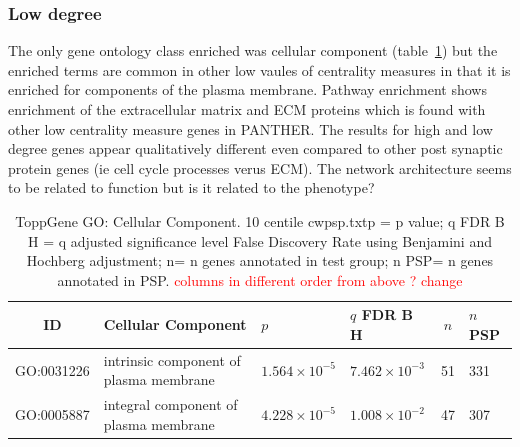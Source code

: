 \subsubsection{Low degree}
The only gene ontology class enriched was cellular component (table~\ref{tab:ToppGENE GO: Cellular Component. 10 centile cwpsp.txtp = p value; q FDR B H = q adjusted significance level False Discovery Rate using Benjamini and Hochberg adjustment; n= n genes annotated in test group; n PSP= n genes annotated in PSP}) but the enriched terms are common in other low vaules of centrality measures in that it is enriched for components of the plasma membrane. Pathway enrichment shows enrichment of the extracellular matrix and ECM proteins which is found with other low centrality measure genes in PANTHER. The results for high and low degree genes appear qualitatively different even compared to other post synaptic protein genes (ie cell cycle processes verus ECM). The network architecture seems to be related to function but is it related to the phenotype?



\begin{table}[ht]
\centering

\begin{adjustbox}{width=\textwidth}
\setlength{\extrarowheight}{2pt}
\begin{tabular}{@{}clllcl@{}}
  \toprule
  ID & Cellular Component &$p$ & $q$ FDR B H  & $n$ & $n$ PSP  \\ 
  \midrule
GO:0031226 & intrinsic component of plasma membrane & $1.564 \times 10^{-5}$ & $7.462 \times 10^{-3}$ & 51 & 331 \\ 
  GO:0005887 & integral component of plasma membrane & $4.228 \times 10^{-5}$ & $1.008 \times 10^{-2}$ & 47 & 307 \\ 
   \bottomrule
\end{tabular}
\end{adjustbox}
\caption{ToppGene GO: Cellular Component. 10 centile cwpsp.txtp = p value; q FDR B H = q adjusted significance level False Discovery Rate using Benjamini and Hochberg adjustment; n= n genes annotated in test group; n PSP= n genes annotated in PSP. \textcolor{red}{columns in different order from above ? change}} 
\label{tab:ToppGENE GO: Cellular Component. 10 centile cwpsp.txtp = p value; q FDR B H = q adjusted significance level False Discovery Rate using Benjamini and Hochberg adjustment; n= n genes annotated in test group; n PSP= n genes annotated in PSP}
\end{table}


